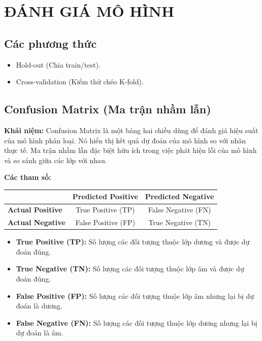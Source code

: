 \section{ĐÁNH GIÁ MÔ HÌNH}

\subsection{Các phương thức}
\begin{itemize}
    \item Hold-out (Chia train/test).
    \item Cross-validation (Kiểm thử chéo K-fold).
\end{itemize}

\subsection{Confusion Matrix (Ma trận nhầm lẫn)}
\textbf{Khái niệm:} Confusion Matrix là một bảng hai chiều dùng để đánh giá hiệu suất của mô hình phân loại. Nó hiển thị kết quả dự đoán của mô hình so với nhãn thực tế. Ma trận nhầm lẫn đặc biệt hữu ích trong việc phát hiện lỗi của mô hình và so sánh giữa các lớp với nhau.

\textbf{Các tham số:}
\begin{table}[H]
    \centering
    \renewcommand{\arraystretch}{1.3}
    \begin{tabular}{|l|c|c|}
        \hline
        & \textbf{Predicted Positive} & \textbf{Predicted Negative} \\
        \hline
        \textbf{Actual Positive} & True Positive (TP) & False Negative (FN) \\
        \hline
        \textbf{Actual Negative} & False Positive (FP) & True Negative (TN) \\
        \hline
    \end{tabular}
\end{table}

\begin{itemize}
    \item \textbf{True Positive (TP):} Số lượng các đối tượng thuộc lớp dương và được dự đoán đúng.
    \item \textbf{True Negative (TN):} Số lượng các đối tượng thuộc lớp âm và được dự đoán đúng.
    \item \textbf{False Positive (FP):} Số lượng các đối tượng thuộc lớp âm nhưng lại bị dự đoán là dương.
    \item \textbf{False Negative (FN):} Số lượng các đối tượng thuộc lớp dương nhưng lại bị dự đoán là âm.
\end{itemize}

